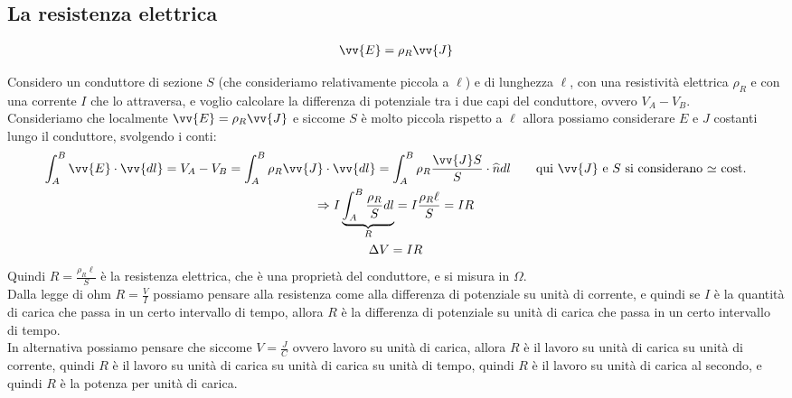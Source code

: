 \documentclass[a4paper, oneside]{article}
\begin{document}
\subsection{La resistenza elettrica}
\begin{gather*}
    \vv{E} = \rho_R \vv{J}
\end{gather*}
\begin{center}
\end{center}
Considero un conduttore di sezione $S$ (che consideriamo relativamente piccola a $\ell$) e di lunghezza $\ell$, con una resistività elettrica $\rho_R$ e con una corrente $I$ che lo attraversa, e voglio calcolare la differenza di potenziale tra i due capi del conduttore, ovvero $V_A - V_B$.\\
Consideriamo che localmente $\vv{E} = \rho_R \vv{J}$ e siccome  $S$ è molto piccola rispetto a $\ell$ allora possiamo considerare $E$ e $J$ costanti lungo il conduttore, svolgendo i conti:
\begin{gather*}
    \int_{A}^{B} \vv{E} \cdot \vv{dl} = V_A - V_B = \int_{A}^{B} \rho_R \vv{J} \cdot \vv{dl} = \int_{A}^{B} \rho_R \frac{\vv{J} S}{S} \cdot \widehat{n} dl \qquad \text{qui $\vv{J}$ e $S$ si considerano $\simeq$ cost.}\\
    \Rightarrow I \underbrace{\int_{A}^{B} \frac{\rho_R}{S} dl}_{R} = I \frac{\rho_R \ell}{S} = I R\\
    \Delta V = I R
\end{gather*}
Quindi $R = \frac{\rho_R \ell}{S}$ è la resistenza elettrica, che è una proprietà del conduttore, e si misura in $\Omega$.\\
Dalla legge di ohm $R = \frac{V}{I}$ possiamo pensare alla resistenza come alla differenza di potenziale su unità di corrente, e quindi se $I$ è la quantità di carica che passa in un certo intervallo di tempo, allora $R$ è la differenza di potenziale su unità di carica che passa in un certo intervallo di tempo.\\
In alternativa possiamo pensare che siccome $V = \frac{J}{C}$ ovvero lavoro su unità di carica, allora $R$ è il lavoro su unità di carica su unità di corrente, quindi $R$ è il lavoro su unità di carica su unità di carica su unità di tempo, quindi $R$ è il lavoro su unità di carica al secondo, e quindi $R$ è la potenza per unità di carica.\\
\end{document}
